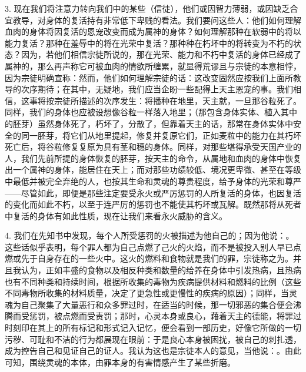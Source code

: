 3. 现在我们将注意力转向我们中的某些（信徒），他们或因智力薄弱，或因缺乏合宜教导，对身体的复活持有非常低下卑贱的看法。我们要问这些人：他们如何理解血肉的身体将因复活的恩宠改变而成为属神的身体？如何理解那种在软弱中的将以能力复活？那种在羞辱中的将在光荣中复活？那种种在朽坏中的将转变为不朽的状态？因为，若他们相信宗徒所说的，那在光荣、能力和不朽中复活的身体已经成了属神的，那么再声称它可被血肉的情欲所缠累，就显得荒谬且与宗徒的本意相悖，因为宗徒明确宣称：然而，他们如何理解宗徒的话：这改变固然应按我们上面所教导的次序期待；在其中，无疑地，我们应当企盼一些配得上天主恩宠的事。我们相信，这事将按宗徒所描述的次序发生：将播种在地里，天主就，一旦那谷粒死了。同样，我们的身体也应被设想像谷粒一样落入地里；（那包含身体实体、植入其中的胚芽）虽然身体死了，朽坏了，分散了，但靠着天主的话，那常在身体实体中安全的同一胚芽，将它们从地里提起，修复并复原它们，正如麦粒中的能力在其朽坏死亡后，将谷粒修复复原为具有茎和穗的身体。同样，对那些堪得承受天国产业的人，我们先前所提的身体恢复的胚芽，按天主的命令，从属地和血肉的身体中恢复出一个属神的身体，能居住在天上；而对那些功绩较低、境况更卑微、甚至在等级中最低并被完全弃绝的人，也按其生命和灵魂的尊贵程度，给予身体的光荣和尊严——尽管如此，即便是那些注定要受永火或严厉惩罚的人所复活的身体，也因复活的变化而如此不朽，以至于连严厉的惩罚也不能使其朽坏或瓦解。既然那将从死者中复活的身体有如此性质，现在让我们来看永火威胁的含义。\par

4. 我们在先知书中发现，每个人所受惩罚的火被描述为他自己的；因为他说：。这些话似乎表明，每个罪人都为自己点燃了己火的火焰，而不是被投入别人早已点燃或先于自身存在的一些火中。这火的燃料和食物就是我们的罪，宗徒称之为。并且我认为，正如丰盛的食物以及相反种类和数量的给养在身体中引发热病，且热病也有不同种类和持续时间，根据所收集的毒物为疾病提供材料和燃料的比例（这些不同毒物所收集的材料质量，决定了更急性或更慢性的疾病的原因）；同样，当灵魂为自己聚集了大量恶行和众多罪过时，在适当的时候，那一切邪恶的集合便会沸腾而受惩罚，被点燃而受责罚；那时，心灵本身或良心，藉着天主的德能，将罪过时刻印在其上的所有标记和形式记入记忆，便会看到一部历史，好像它所做的一切污秽、可耻和不洁的行为都展现在眼前：于是良心本身被困扰，被自己的刺扎透，成为控告自己和见证自己的证人。我认为这也是宗徒本人的意见，当他说：。由此可知，围绕灵魂的本体，由罪本身的有害情感产生了某些折磨。\par

